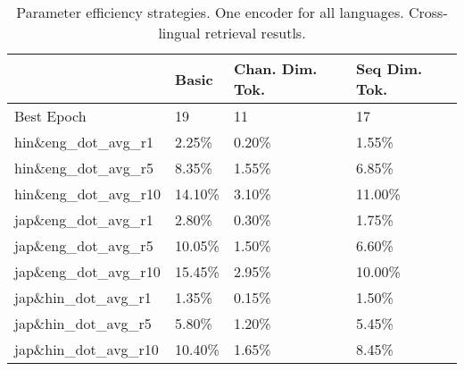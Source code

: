 \begin{table}
    \centering
    \begin{tabular}{llll}
    \toprule
    {} & Basic & Chan. Dim. Tok. & Seq Dim. Tok. \\
    \midrule
    Best Epoch          &                     19 &                        11 &                            17 \\
    hin\&eng\_dot\_avg\_r1  &                  2.25\% &                     0.20\% &                         1.55\% \\
    hin\&eng\_dot\_avg\_r5  &                  8.35\% &                     1.55\% &                         6.85\% \\
    hin\&eng\_dot\_avg\_r10 &                 14.10\% &                     3.10\% &                        11.00\% \\
    jap\&eng\_dot\_avg\_r1  &                  2.80\% &                     0.30\% &                         1.75\% \\
    jap\&eng\_dot\_avg\_r5  &                 10.05\% &                     1.50\% &                         6.60\% \\
    jap\&eng\_dot\_avg\_r10 &                 15.45\% &                     2.95\% &                        10.00\% \\
    jap\&hin\_dot\_avg\_r1  &                  1.35\% &                     0.15\% &                         1.50\% \\
    jap\&hin\_dot\_avg\_r5  &                  5.80\% &                     1.20\% &                         5.45\% \\
    jap\&hin\_dot\_avg\_r10 &                 10.40\% &                     1.65\% &                         8.45\% \\
    \bottomrule
    \end{tabular}
\caption{Parameter efficiency strategies. One encoder for all languages. Cross-lingual retrieval resutls.}
\label{table:param_eff_cling_ret}
\end{table}
